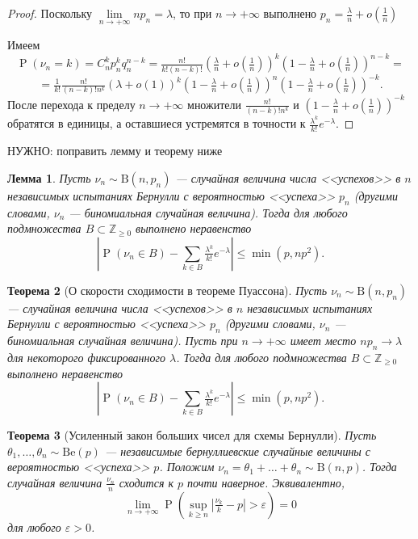 \documentclass[12pt]{article}
\newtheorem{theorem}{Теорема}
\newtheorem{lemma}[theorem]{Лемма}
\numberwithin{theorem}{section}
\theoremstyle{definition}
\newcommand{\prob}{\operatorname{P}}
\newcommand{\TODO}[1]{\textcolor{todocolor}{НУЖНО: #1}}
\begin{document}
	\begin{proof}
		Поскольку $ \lim\limits_{n \to +\infty} np_n = \lambda $,
		то при $ n \to +\infty $ выполнено $ p_n =  \tfrac{\lambda}{n} + o(\tfrac{1}{n}) $
		
		Имеем 
		$$ \prob(\nu_n = k) = C_{n}^kp_n^kq_n^{n - k} 
		= \tfrac{n!}{k!(n - k)!}\left(\tfrac{\lambda}{n} + o(\tfrac{1}{n})\right)^k
		\left(1 - \tfrac{\lambda}{n} + o(\tfrac{1}{n})\right)^{n - k} = $$
		$$ = \tfrac{1}{k!} \tfrac{n!}{(n - k)!n^{k}}\left(\lambda + o(1)\right)^k
		\left(1 - \tfrac{\lambda}{n} + o(\tfrac{1}{n})\right)^{n}\left(1 - \tfrac{\lambda}{n} + o(\tfrac{1}{n})\right)^{-k}. $$
		После перехода к пределу $ n \to +\infty $
		множители $ \tfrac{n!}{(n - k)!n^{k}} $ и $ \left(1 - \tfrac{\lambda}{n} + o(\tfrac{1}{n})\right)^{-k} $
		обратятся в единицы, а оставшиеся устремятся в точности к $ \tfrac{\lambda^k}{k!}e^{-\lambda} $.
	\end{proof}
	
	\TODO{поправить лемму и теорему ниже}
	
	\begin{lemma}
		Пусть $ \nu_n \sim \mathrm{B}(n, p_n) $ --- случайная величина числа <<успехов>> в $ n $ независимых испытаниях Бернулли
		с вероятностью <<успеха>> $ p_n $ (другими словами, $ \nu_n $ --- биномиальная случайная величина).
		Тогда для любого подмножества $ B \subset \mathbb{Z}_{\geqslant 0} $ выполнено неравенство
		$$ \left|\prob(\nu_n \in B) - \sum\limits_{k \in B}\tfrac{\lambda^k}{k!}e^{-\lambda}\right| \leqslant \min(p, np^2). $$
	\end{lemma}
	
	\begin{theorem}[О скорости сходимости в теореме Пуассона] 
		Пусть $ \nu_n \sim \mathrm{B}(n, p_n) $ --- случайная величина числа <<успехов>> в $ n $ независимых испытаниях Бернулли
		с вероятностью <<успеха>> $ p_n $ (другими словами, $ \nu_n $ --- биномиальная случайная величина).
		Пусть при $ n \to +\infty $ имеет место $ np_n \to \lambda $ для некоторого фиксированного $ \lambda $.
		Тогда для любого подмножества $ B \subset \mathbb{Z}_{\geqslant 0} $ выполнено неравенство
		$$ \left|\prob(\nu_n \in B) - \sum\limits_{k \in B}\tfrac{\lambda^k}{k!}e^{-\lambda}\right| \leqslant \min(p, np^2). $$
	\end{theorem}
	
	\begin{theorem}[Усиленный закон больших чисел для схемы Бернулли] \label{large numbers law | Bernoulli}
		Пусть $ \theta_1, \ldots, \theta_n \sim \mathrm{Be}(p) $ --- независимые бернуллиевские случайные величины
		с вероятностью <<успеха>> $ p $. Положим $ \nu_n = \theta_1 + \ldots + \theta_n \sim \mathrm{B}(n, p) $.
		Тогда случайная величина $ \tfrac{\nu_n}{n} $ сходится к $ p $ почти наверное.
		Эквивалентно,
		$$ \lim\limits_{n \to +\infty} 
		\prob(\sup\limits_{k \geqslant n} \left|\tfrac{\nu_k}{k} - p\right| > \varepsilon) = 0 $$
		для любого $ \varepsilon > 0 $.
	\end{theorem}
	
\end{document}
